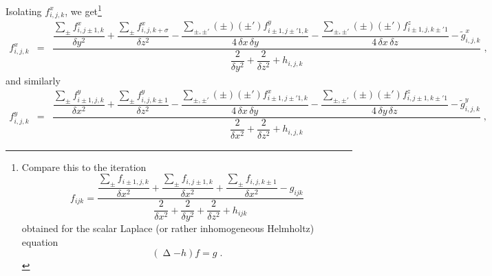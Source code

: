 \documentclass[\mydriver,12pt,twoside,notitlepage,letterpaper]{article}
\newcommand{\Laplace} { \mathop{\Delta}\nolimits}
\begin{document}
Isolating $f^{x}_{i,j,k}$, we get\footnote{
  Compare this to the iteration
  \begin{equation}
    f_{ijk}
    = \dfrac{\dfrac{\sum\limits_{\pm}
                      f_{i\pm1,j,k}}
                   {\delta x^2}
             +
             \dfrac{\sum\limits_{\pm}
                      f_{i,j\pm1,k}}
                   {\delta x^2}
             +
             \dfrac{\sum\limits_{\pm}
                      f_{i,j,k\pm1}}
                   {\delta x^2}
             - g_{ijk}
            }
            {\dfrac{2}{\delta x^2}
             + \dfrac{2}{\delta y^2}
             + \dfrac{2}{\delta z^2}
             + h_{ijk}
            }
  \end{equation}
  obtained for the scalar Laplace (or rather inhomogeneous Helmholtz)
  equation
  \begin{equation}
    (\Laplace - h) f = g \; .
  \end{equation}
}
\begin{eqnarray}
  f^{x}_{i,j,k}
  &=& \dfrac{\dfrac{\sum\limits_{\pm}
                      f^{x}_{i,j\pm1,k}}
                   {\delta y^2}
             +
             \dfrac{\sum\limits_{\pm}
                      f^{x}_{i,j,k+\sigma}}
                   {\delta z^2}
             -
             \dfrac{\sum\limits_{\pm,\pm'}
                      (\pm) (\pm') f^{y}_{i\pm1,j\pm'1,k}}
                   {4\,\delta x\,\delta y}
             -
             \dfrac{\sum\limits_{\pm,\pm'}
                      (\pm) (\pm') f^{z}_{i\pm1,j,k\pm'1}}
                   {4\,\delta x\,\delta z}
             - \tilde{g}^{x}_{i,j,k}
            }
            {\dfrac{2}{\delta y^2} + \dfrac{2}{\delta z^2} + h_{i,j,k}} \; ,
\end{eqnarray}
and similarly
\begin{eqnarray}
  f^{y}_{i,j,k}
  &=& \dfrac{\dfrac{\sum\limits_{\pm}
                      f^{y}_{i\pm1,j,k}}
                   {\delta x^2}
             +
             \dfrac{\sum\limits_{\pm}
                      f^{y}_{i,j,k\pm1}}
                   {\delta z^2}
             -
             \dfrac{\sum\limits_{\pm,\pm'}
                      (\pm) (\pm') f^{x}_{i\pm1,j\pm'1,k}}
                   {4\,\delta x\,\delta y}
             -
             \dfrac{\sum\limits_{\pm,\pm'}
                      (\pm) (\pm') f^{z}_{i,j\pm1,k\pm'1}}
                   {4\,\delta y\,\delta z}
             - \tilde{g}^{y}_{i,j,k}
            }
            {\dfrac{2}{\delta x^2} + \dfrac{2}{\delta z^2} + h_{i,j,k}} \; ,
\end{eqnarray}
\end{document}
